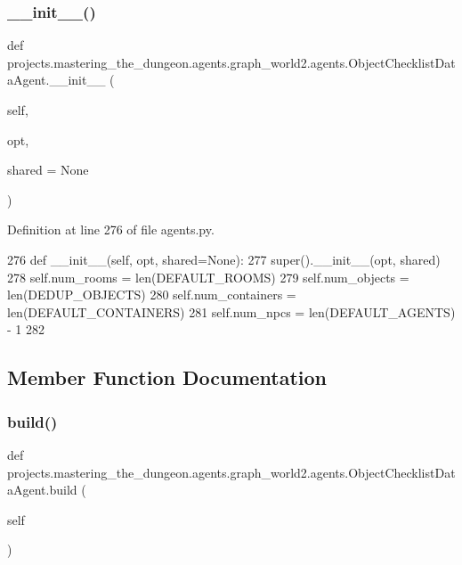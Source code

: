 \subsubsection{\texorpdfstring{\+\_\+\+\_\+init\+\_\+\+\_\+()}{\_\_init\_\_()}}
{\footnotesize\ttfamily def projects.\+mastering\+\_\+the\+\_\+dungeon.\+agents.\+graph\+\_\+world2.\+agents.\+Object\+Checklist\+Data\+Agent.\+\_\+\+\_\+init\+\_\+\+\_\+ (\begin{DoxyParamCaption}\item[{}]{self,  }\item[{}]{opt,  }\item[{}]{shared = {\ttfamily None} }\end{DoxyParamCaption})}



Definition at line 276 of file agents.\+py.


\begin{DoxyCode}
276     \textcolor{keyword}{def }\_\_init\_\_(self, opt, shared=None):
277         super().\_\_init\_\_(opt, shared)
278         self.num\_rooms = len(DEFAULT\_ROOMS)
279         self.num\_objects = len(DEDUP\_OBJECTS)
280         self.num\_containers = len(DEFAULT\_CONTAINERS)
281         self.num\_npcs = len(DEFAULT\_AGENTS) - 1
282 
\end{DoxyCode}


\subsection{Member Function Documentation}
\mbox{\label{classprojects_1_1mastering__the__dungeon_1_1agents_1_1graph__world2_1_1agents_1_1ObjectChecklistDataAgent_a737bd4ebc72fc211d6b84132d4a65168}} 
\subsubsection{\texorpdfstring{build()}{build()}}
{\footnotesize\ttfamily def projects.\+mastering\+\_\+the\+\_\+dungeon.\+agents.\+graph\+\_\+world2.\+agents.\+Object\+Checklist\+Data\+Agent.\+build (\begin{DoxyParamCaption}\item[{}]{self }\end{DoxyParamCaption})}



